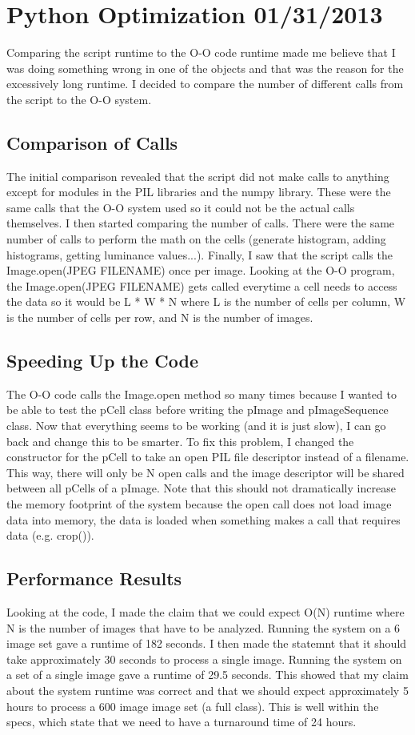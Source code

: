 \documentclass[]{article}
\begin{document}
    \section{Python Optimization 01/31/2013}
	Comparing the script runtime to the O-O code runtime made me believe that I was doing something wrong in one of the objects and that was the reason for the excessively long runtime. I decided to compare the number of different calls from the script to the O-O system. 

		\subsection{Comparison of Calls}
			The initial comparison revealed that the script did not make calls to anything except for modules in the PIL libraries and the numpy library. These were the same calls that the O-O system used so it could not be the actual calls themselves. I then started comparing the number of calls. There were the same number of calls to perform the math on the cells (generate histogram, adding histograms, getting luminance values...). Finally, I saw that the script calls the Image.open(JPEG FILENAME) once per image. Looking at the O-O program, the Image.open(JPEG FILENAME) gets called everytime a cell needs to access the data so it would be L * W * N where L is the number of cells per column, W is the number of cells per row, and N is the number of images.

		\subsection{Speeding Up the Code}
			The O-O code calls the Image.open method so many times because I wanted to be able to test the pCell class before writing the pImage and pImageSequence class. Now that everything seems to be working (and it is just slow), I can go back and change this to be smarter. To fix this problem, I changed the constructor for the pCell to take an open PIL file descriptor instead of a filename. This way, there will only be N open calls and the image descriptor will be shared between all pCells of a pImage. Note that this should not dramatically increase the memory footprint of the system because the open call does not load image data into memory, the data is loaded when something makes a call that requires data (e.g. crop()). 

      		\subsection{Performance Results}
			Looking at the code, I made the claim that we could expect O(N) runtime where N is the number of images that have to be analyzed. Running the system on a 6 image set gave a runtime of 182 seconds. I then made the statemnt that it should take approximately 30 seconds to process a single image. Running the system on a set of a single image gave a runtime of 29.5 seconds. This showed that my claim about the system runtime was correct and that we should expect approximately 5 hours to process a 600 image image set (a full class). This is well within the specs, which state that we need to have a turnaround time of 24 hours. 
            
\end{document}
